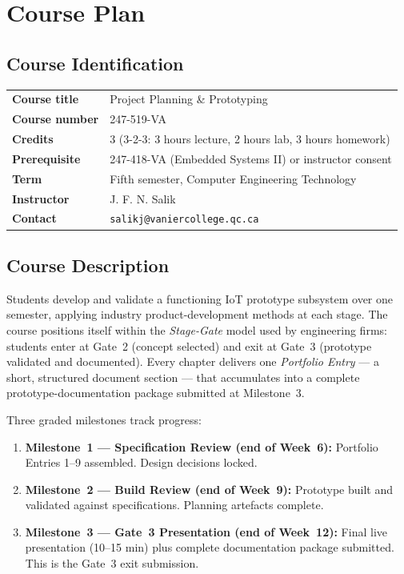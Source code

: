 \documentclass[twoside]{../Sparkle}
\begin{document}
\chapter*{Course Plan}

\section*{Course Identification}

\begin{tabular}{@{}ll@{}}
\textbf{Course title}     & Project Planning \& Prototyping \\
\textbf{Course number}    & 247-519-VA \\
\textbf{Credits}          & 3 (3-2-3: 3 hours lecture, 2 hours lab, 3 hours homework) \\
\textbf{Prerequisite}     & 247-418-VA (Embedded Systems II) or instructor consent \\
\textbf{Term}             & Fifth semester, Computer Engineering Technology \\
\textbf{Instructor}       & J. F. N. Salik \\
\textbf{Contact}          & \texttt{salikj@vaniercollege.qc.ca} \\
\end{tabular}

\bigskip

\section*{Course Description}

Students develop and validate a functioning IoT prototype subsystem over one semester,
applying industry product-development methods at each stage.
The course positions itself within the \emph{Stage-Gate} model used by engineering firms:
students enter at Gate~2 (concept selected) and exit at Gate~3 (prototype validated and
documented). Every chapter delivers one \emph{Portfolio Entry} --- a short, structured
document section --- that accumulates into a complete prototype-documentation package
submitted at Milestone~3.

Three graded milestones track progress:
\begin{enumerate}
\item \textbf{Milestone~1 --- Specification Review (end of Week~6):}
      Portfolio Entries 1--9 assembled. Design decisions locked.
\item \textbf{Milestone~2 --- Build Review (end of Week~9):}
      Prototype built and validated against specifications. Planning artefacts complete.
\item \textbf{Milestone~3 --- Gate~3 Presentation (end of Week~12):}
      Final live presentation (10--15 min) plus complete documentation package
      submitted. This is the Gate~3 exit submission.
\end{enumerate}
\end{document}
